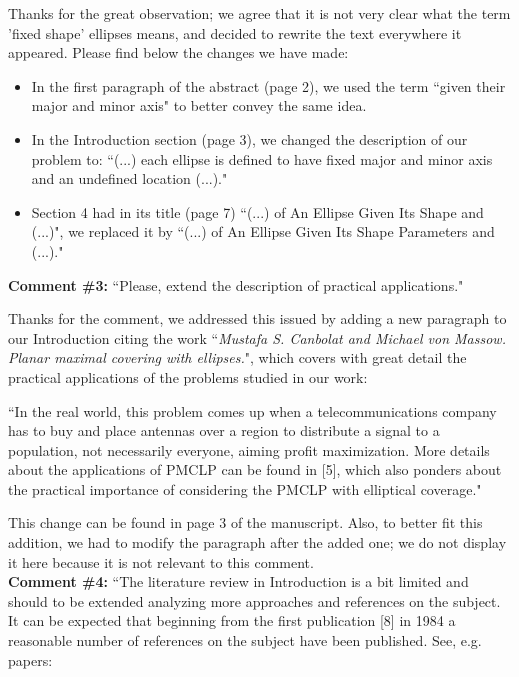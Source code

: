 		Thanks for the great observation; we agree that it is not very clear what the term 'fixed shape' ellipses means, and decided to rewrite the text everywhere it appeared. Please find below the changes we have made:
		\begin{itemize}
			\item In the first paragraph of the abstract (page 2), we used the term ``given their major and minor axis" to better convey the same idea.
			
			\item In the Introduction section (page 3), we changed the description of our problem to: ``(...) each ellipse is defined to have fixed major and minor axis and an undefined location (...)."
			
			\item Section 4 had in its title (page 7) ``(...) of An Ellipse Given Its Shape and (...)", we replaced it by ``(...) of An Ellipse Given Its Shape Parameters and (...)."
		\end{itemize}
		
		\textbf{Comment \#3:} ``Please, extend the description of practical applications."
		
		Thanks for the comment, we addressed this issued by adding a new paragraph to our Introduction citing the work ``\textit{Mustafa S. Canbolat and Michael von Massow. Planar maximal covering with ellipses.}", which covers with great detail the practical applications of the problems studied in our work:
		
		``In the real world, this problem comes up when a telecommunications company has to buy and
		place antennas over a region to distribute a signal to a population, not necessarily everyone, aiming
		profit maximization. More details about the applications of PMCLP can be found in [5], which also
		ponders about the practical importance of considering the PMCLP with elliptical coverage."
		
		This change can be found in page 3 of the manuscript. Also, to better fit this addition, we had to modify the paragraph after the added one; we do not display it here because it is not relevant to this comment.
		\\
		
		\textbf{Comment \#4:} ``The literature review in Introduction is a bit limited and should to be extended analyzing more approaches and references on the subject. It can be expected that beginning from the first publication [8] in 1984 a reasonable number of references on the subject have been published. See, e.g. papers:
		
